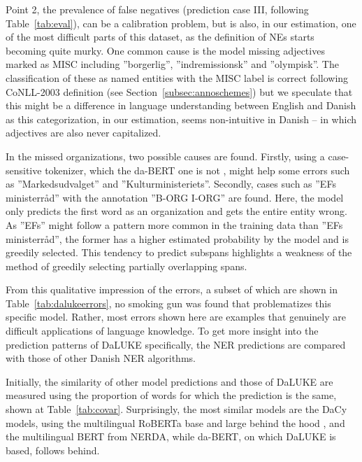 \documentclass[main.tex]{subfiles}
\begin{document}
Point 2, the prevalence of false negatives (prediction case III, following Table~\ref{tab:eval}), can be a calibration problem,
but is also, in our estimation, one of the most difficult parts of this dataset, as the definition of NEs starts becoming quite murky.
One common cause is the model missing adjectives marked as MISC including ''borgerlig'', ''indremissionsk'' and ''olympisk''.
The classification of these as named entities with the MISC label is correct following CoNLL-2003 definition (see Section~\ref{subsec:annoschemes}) but we speculate that this might be a difference in language understanding between English and Danish as this categorization, in our estimation, seems non-intuitive in Danish -- in which adjectives are also never capitalized.

In the missed organizations, two possible causes are found.
Firstly, using a case-sensitive tokenizer, which the da-BERT one is not \cite{botxo2019dabert}, might help some errors such as ''Markedsudvalget'' and ''Kulturministeriets''.
Secondly, cases such as ''EFs ministerråd'' with the annotation ''B-ORG I-ORG'' are found.
Here, the model only predicts the first word as an organization and gets the entire entity wrong.
As ''EFs'' might follow a pattern more common in the training data than ''EFs ministerråd'', the former has a higher estimated probability by the model and is greedily selected.
This tendency to predict subspans highlights a weakness of the method of greedily selecting partially overlapping spans.

From this qualitative impression of the errors, a subset of which are shown in Table~\ref{tab:dalukeerrors}, no smoking gun was found that problematizes this specific model.
Rather, most errors shown here are examples that genuinely are difficult applications of language knowledge.
To get more insight into the prediction patterns of DaLUKE specifically, the NER predictions are compared with those of other Danish NER algorithms.

Initially, the similarity of other model predictions and those of DaLUKE are measured using the proportion of words for which the prediction is the same, shown at Table~\ref{tab:covar}.
Surprisingly, the most similar models are the DaCy models, using the multilingual RoBERTa base and large behind the hood \cite{enevoldsen2020dacy}, and the multilingual BERT from NERDA, while da-BERT, on which DaLUKE is based, follows behind.
\end{document}
